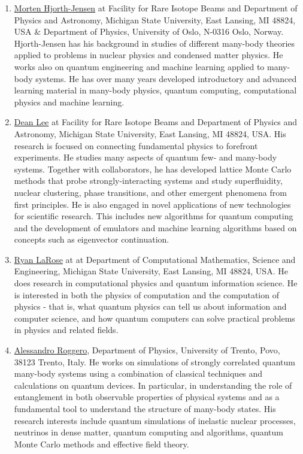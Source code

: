 \documentclass[prc,amsart,english]{revtex4-2}
\begin{document}
\begin{enumerate}
\item
  \href{http://mhjgit.github.io/info/doc/web/}{Morten Hjorth-Jensen} at
  Facility for Rare Isotope Beams and Department of Physics and
  Astronomy, Michigan State University, East Lansing, MI 48824, USA \&
  Department of Physics, University of Oslo, N-0316 Oslo, Norway. Hjorth-Jensen has his background in studies of different many-body theories applied to problems in nuclear physics and condensed matter physics. He works also on quantum engineering and machine learning applied to many-body systems. He has over many years developed introductory and advanced learning material in many-body physics, quantum computing, computational physics and machine learning.
\item
  \href{https://frib.msu.edu/for-students/faculty/lee-profile}{Dean Lee}
  at Facility for Rare Isotope Beams and Department of Physics and
  Astronomy, Michigan State University, East Lansing, MI 48824, USA. His research is focused on connecting fundamental physics to forefront experiments. He studies many aspects of quantum few- and many-body systems. Together with collaborators, he has developed lattice Monte Carlo methods that probe strongly-interacting systems and study superfluidity, nuclear clustering, phase transitions, and other emergent phenomena from first principles. He  is also engaged in novel applications of new technologies for scientific research. This includes new algorithms for quantum computing and the development of emulators and machine learning algorithms based on concepts such as eigenvector continuation.
\item
  \href{https://www.ryanlarose.com/}{Ryan LaRose} at at Department of
  Computational Mathematics, Science and Engineering, Michigan State
  University, East Lansing, MI 48824, USA. He does research in computational physics and quantum information science. He is  interested in both the physics of computation and the computation of physics - that is, what quantum physics can tell us about information and computer science, and how quantum computers can solve practical problems in physics and related fields.
\item
  \href{https://webapps.unitn.it/du/en/Persona/PER0016084/Didattica}{Alessandro
  Roggero}, Department of Physics, University of Trento, Povo, 38123
  Trento, Italy. He works on  simulations of strongly correlated quantum many-body systems using a combination of classical techniques and calculations on
quantum devices. In particular, in understanding the role of entanglement in both observable properties of physical systems and as a fundamental tool to understand the structure of many-body states. His research interests include quantum simulations of inelastic nuclear processes, neutrinos in dense matter, quantum computing and algorithms, quantum Monte Carlo methods and effective field theory.


\end{enumerate}
\end{document}
